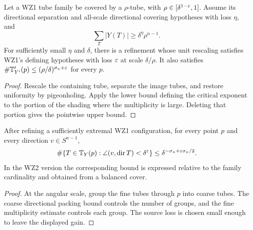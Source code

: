 \begin{lemma}
\label{lem:wz1-rescaled-fibre}
Let a WZ1 tube family be covered by a $\rho$-tube, with
$\rho\in[\delta^{1-\varepsilon},1]$. Assume its directional separation and
all-scale directional covering hypotheses with loss $\eta$, and
\[
                 \sum_T|Y(T)|\geq\delta^\eta\rho^{n-1}.
\]
For sufficiently small $\eta$ and $\delta$, there is a refinement
whose unit rescaling satisfies WZ1's defining hypotheses with loss
$\varepsilon$ at scale $\delta/\rho$. It also satisfies
$\#\mathbb{T}'_{Y'}(p)\leq(\rho/\delta)^{\sigma_n+\varepsilon}$ for every $p$.
\end{lemma}
\begin{proof}
Rescale the containing tube, separate the image tubes, and restore
uniformity by pigeonholing. Apply the lower bound defining the critical
exponent to the portion of the shading where the multiplicity is large.
Deleting that portion gives the pointwise upper bound.
\end{proof}

\begin{lemma}
\label{lem:robust-transversality}
After refining a sufficiently extremal WZ1 configuration, for every
point $p$ and every direction $v\in S^{n-1}$,
\[
 \#\{T\in\mathbb{T}_Y(p):\angle(v,\operatorname{dir} T)<\delta^\varepsilon\}
       \leq\delta^{-\sigma_n+\varepsilon\sigma_n/2}.
\]
In the WZ2 version the corresponding bound is expressed relative to
the family cardinality and obtained from a balanced cover.
\end{lemma}
\begin{proof}
At the angular scale, group the fine tubes through $p$ into coarse
tubes. The coarse directional packing bound controls the number of
groups, and the fine multiplicity estimate controls each group. The
source loss is chosen small enough to leave the displayed gain.
\end{proof}

